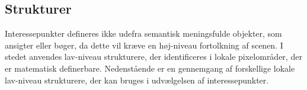 \subsection{Strukturer}
Interessepunkter defineres ikke udefra semantisk meningsfulde objekter, som ansigter eller bøger, da dette vil kræve en høj-niveau fortolkning af scenen. I stedet anvendes lav-niveau strukturere, der identificeres i lokale pixelområder, der er matematisk definerbare. Nedenstående er en gennemgang af forskellige lokale lav-niveau strukturere, der kan bruges i udvælgelsen af interessepunkter.

